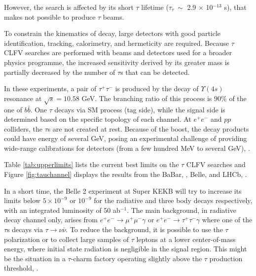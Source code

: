 However, the search is affected by its  
short $\tau$ lifetime  
($\tau_\tau \ \sim$ 2.9 $\times$ 10$^{-13}$ s), that 
makes not possible to produce 
$\tau$ beams.

To constrain the kinematics of decay, 
large detectors with good particle 
identification, tracking, calorimetry, 
and hermeticity are required. 
Because $\tau$ CLFV searches are performed  
with beams and detectors used for a 
broader physics programme, 
the increased sensitivity derived by 
its greater mass is partially decreased 
by the number of $\tau$s that can be detected.

In these experiments, a pair of 
$\tau^+ \tau^-$ is produced by the 
decay of $\Upsilon(4s)$ resonance at 
$\sqrt{s}=10.58$ GeV. The branching ratio 
of this process is  $90\%$ of 
the one of $b \bar{b}$. One $\tau$ decays 
via SM process (tag side), 
while the signal side is determined based on 
the specific topology of each channel. 
At $e^+ e^-$ and $pp$ colliders, the $\tau$s 
are not created at rest. Because of the boost, 
the decay products could have 
energy of several GeV, posing an experimental 
challenge of providing wide-range calibrations 
for detectors (from a few hundred MeV to several GeV), 
\cite{universe8060299}.

Table \ref{tab:upperlimits} lists the 
current best limits on the $\tau$ 
CLFV searches and Figure \ref{fig:tauchannel} 
displays the results from the BaBar, 
\cite{PhysRevD.77.091104}, Belle, 
\cite{ABASHIAN2002117} and LHCb, 
\cite{TheLHCbCollaboration2008}. 

In a short time, the Belle 2 experiment at 
Super KEKB will try to increase its limits 
below $5 \times 10^{-9}$ or $10^{-9}$ for 
the radiative and three body decays respectively, 
with an integrated luminosity of 50 ab$^{-1}$. 
The main background, in radiative decay  
channel only, arises from
$e^+ e^- \rightarrow \mu^+ \mu^- \gamma$ or 
$e^+ e^- \rightarrow \tau^+ \tau^- \gamma$ 
where one of the $\tau$s decays via 
$\tau \rightarrow \nu \bar{\nu}$.
To reduce the background, it is possible to 
use the $\tau$ polarization or to collect 
large samples of
$\tau$ leptons at a lower center-of-mass energy, 
where initial state radiation is negligible in 
the signal region. This might be the situation 
in a $\tau$-charm 
factory operating slightly above the $\tau$ 
production threshold, \cite{Bennett_2016}. 


